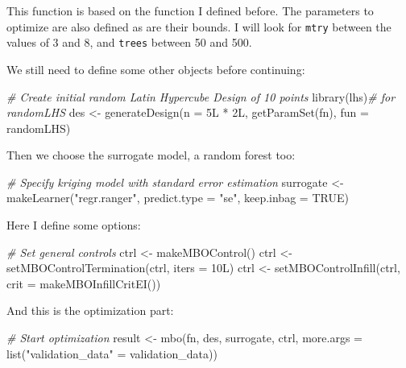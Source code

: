 \documentclass[
]{article}
\newenvironment{Shaded}{\begin{snugshade}}{\end{snugshade}}
\newcommand{\AttributeTok}[1]{\textcolor[rgb]{0.77,0.63,0.00}{#1}}
\newcommand{\CommentTok}[1]{\textcolor[rgb]{0.56,0.35,0.01}{\textit{#1}}}
\newcommand{\ConstantTok}[1]{\textcolor[rgb]{0.00,0.00,0.00}{#1}}
\newcommand{\FunctionTok}[1]{\textcolor[rgb]{0.00,0.00,0.00}{#1}}
\newcommand{\NormalTok}[1]{#1}
\newcommand{\OtherTok}[1]{\textcolor[rgb]{0.56,0.35,0.01}{#1}}
\newcommand{\SpecialCharTok}[1]{\textcolor[rgb]{0.00,0.00,0.00}{#1}}
\newcommand{\StringTok}[1]{\textcolor[rgb]{0.31,0.60,0.02}{#1}}
\begin{document}
This function is based on the function I defined before. The parameters to optimize are also
defined as are their bounds. I will look for \texttt{mtry} between the values of 3 and 8, and \texttt{trees}
between 50 and 500.

We still need to define some other objects before continuing:

\begin{Shaded}
\begin{Highlighting}[]
\CommentTok{\# Create initial random Latin Hypercube Design of 10 points}
\FunctionTok{library}\NormalTok{(lhs)}\CommentTok{\# for randomLHS}
\NormalTok{des }\OtherTok{\textless{}{-}} \FunctionTok{generateDesign}\NormalTok{(}\AttributeTok{n =}\NormalTok{ 5L }\SpecialCharTok{*}\NormalTok{ 2L, }\FunctionTok{getParamSet}\NormalTok{(fn), }\AttributeTok{fun =}\NormalTok{ randomLHS)}
\end{Highlighting}
\end{Shaded}

Then we choose the surrogate model, a random forest too:

\begin{Shaded}
\begin{Highlighting}[]
\CommentTok{\# Specify kriging model with standard error estimation}
\NormalTok{surrogate }\OtherTok{\textless{}{-}} \FunctionTok{makeLearner}\NormalTok{(}\StringTok{"regr.ranger"}\NormalTok{, }\AttributeTok{predict.type =} \StringTok{"se"}\NormalTok{, }\AttributeTok{keep.inbag =} \ConstantTok{TRUE}\NormalTok{)}
\end{Highlighting}
\end{Shaded}

Here I define some options:

\begin{Shaded}
\begin{Highlighting}[]
\CommentTok{\# Set general controls}
\NormalTok{ctrl }\OtherTok{\textless{}{-}} \FunctionTok{makeMBOControl}\NormalTok{()}
\NormalTok{ctrl }\OtherTok{\textless{}{-}} \FunctionTok{setMBOControlTermination}\NormalTok{(ctrl, }\AttributeTok{iters =}\NormalTok{ 10L)}
\NormalTok{ctrl }\OtherTok{\textless{}{-}} \FunctionTok{setMBOControlInfill}\NormalTok{(ctrl, }\AttributeTok{crit =} \FunctionTok{makeMBOInfillCritEI}\NormalTok{())}
\end{Highlighting}
\end{Shaded}

And this is the optimization part:

\begin{Shaded}
\begin{Highlighting}[]
\CommentTok{\# Start optimization}
\NormalTok{result }\OtherTok{\textless{}{-}} \FunctionTok{mbo}\NormalTok{(fn, des, surrogate, ctrl, }\AttributeTok{more.args =} \FunctionTok{list}\NormalTok{(}\StringTok{"validation\_data"} \OtherTok{=}\NormalTok{ validation\_data))}
\end{Highlighting}
\end{Shaded}
\end{document}
